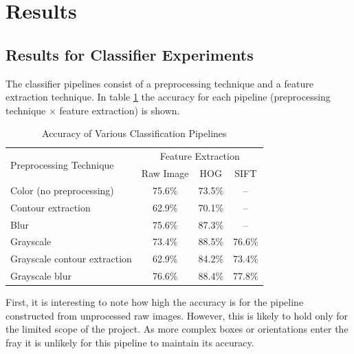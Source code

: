 \documentclass[letterpaper, 10 pt, conference]{conf/ieeeconf}  %
\begin{document}
\section{Results}
\label{sec:results}

\subsection{Results for Classifier Experiments}
The classifier pipelines consist of a preprocessing technique and a feature
extraction technique. In table \ref{tab:classification} the accuracy for each
pipeline (preprocessing technique $\times$ feature extraction) is shown.
\begin{table}[h]
  \centering
  \begin{tabular}{l c c c}
    \toprule
    \multirow{2}{*}[-0.5\dimexpr \aboverulesep + \belowrulesep + \cmidrulewidth]{Preprocessing Technique} & \multicolumn{3}{c}{Feature Extraction}\\
    \cmidrule(lr){2-4}
                                                                                                          & Raw Image & HOG & SIFT \\
    \midrule
    Color (no preprocessing)     & 75.6\% & 73.5\%                    & -- \\
    Contour extraction           & 62.9\% & 70.1\%                    & -- \\
    Blur                         & 75.6\% & 87.3\%                    & -- \\
    Grayscale                    & 73.4\% & \cellcolor{blue!25}88.5\% & 76.6\% \\
    Grayscale contour extraction & 62.9\% & 84.2\%                    & 73.4\% \\
    Grayscale blur               & 76.6\% & 88.4\%                    & 77.8\% \\
    \bottomrule
  \end{tabular}
  \caption{Accuracy of Various Classification Pipelines}
  \label{tab:classification}
\end{table}

First, it is interesting to note how high the accuracy is for the pipeline
constructed from unprocessed raw images. However, this is likely to hold only
for the limited scope of the project. As more complex boxes or orientations
enter the fray it is unlikely for this pipeline to maintain its accuracy.
\end{document}
